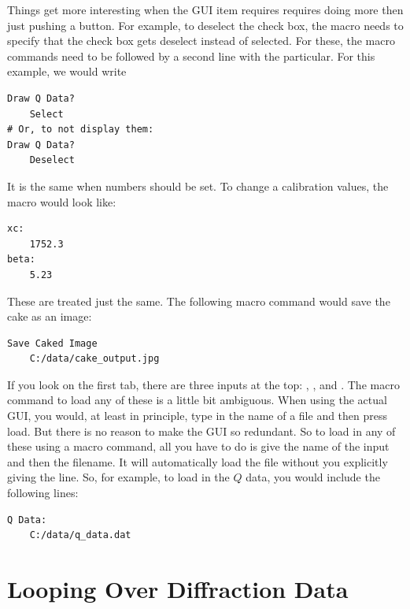 Things get more interesting when the GUI item requires
requires doing more then just pushing a button. For 
example, to deselect the  
check box, the macro needs to specify that the check box
gets deselect instead of selected.
For these, the macro commands need to be followed by
a second line with the particular. For this example, 
we would write
\begin{lstlisting}[caption={'Draw the $Q$ Lines on the Display'}]
Draw Q Data?
    Select
# Or, to not display them:
Draw Q Data?
    Deselect
\end{lstlisting}
It is the same when numbers should be set. To change
a calibration values, the macro would look like:
\begin{lstlisting}[caption={'Input a Number'}]
xc:
    1752.3
beta:
    5.23
\end{lstlisting}
These are treated just the same. The following
macro command would save the cake as an image:
\begin{lstlisting}[caption={'Save the Caked Image'}]
Save Caked Image
    C:/data/cake_output.jpg
\end{lstlisting}

If you look on the first tab, there are three inputs
at the top:
, , and 
. The macro command to load any of these
is a little bit ambiguous. When using the actual GUI, 
you would, at least in principle, type in the name of
a file and then press load. But there is no reason to
make the GUI so redundant. So to load in any of these
using a macro command, all you have to do is give the 
name of the input and then the filename. It will 
automatically load the file without you explicitly
giving the  line. So, for example,
to load in the $Q$ data, you would include the 
following lines:
\begin{lstlisting}[caption={'Load the $Q$ Data'}]
Q Data:
    C:/data/q_data.dat
\end{lstlisting}

\section{Looping Over Diffraction Data}
\label{LoopOverDiffractionData}

